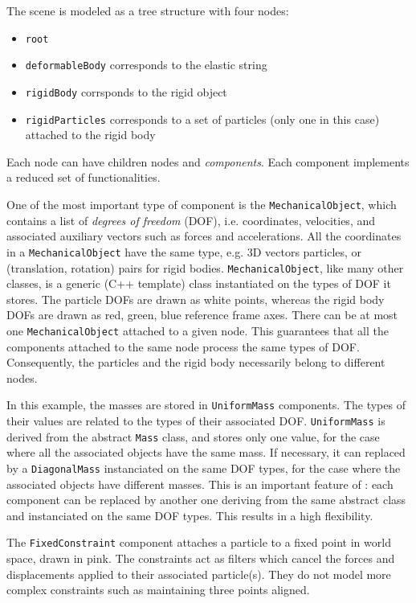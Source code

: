 The scene is modeled as a tree structure with four nodes:
\begin{itemize}
 \item \texttt{root} 
 \item \texttt{deformableBody} corresponds to the elastic string
 \item \texttt{rigidBody} corrsponds to the rigid object
 \item \texttt{rigidParticles} corresponds to a set of particles (only one in this case) attached to the rigid body
\end{itemize}
Each node can have children nodes and \textit{components}. Each component implements a reduced set of functionalities.


One of the most important type of component is the \texttt{MechanicalObject}, which contains a list of \textit{degrees of freedom} (DOF), i.e. coordinates, velocities, and associated auxiliary vectors such as forces and accelerations. 
All the coordinates in a \texttt{MechanicalObject} have the same type, e.g. 3D vectors particles, or (translation, rotation) pairs for rigid bodies. \texttt{MechanicalObject}, like many other \sofa classes, is a generic (C++ template) class instantiated on the types of DOF it stores.
The particle DOFs are drawn as white points, whereas the rigid body DOFs are drawn as red, green, blue reference frame axes.
There can be at most one \texttt{MechanicalObject} attached to a given node. This guarantees that all the components attached to the same node process the same types of DOF. Consequently, the particles and the rigid body necessarily belong to different nodes. 

In this example, the masses are stored in \texttt{UniformMass} components.
The types of their values are related to the types of their associated DOF.
\texttt{UniformMass} is derived from the abstract \texttt{Mass} class, and stores only one value, for the case where all the associated objects have the same mass. If necessary, it can replaced by a \texttt{DiagonalMass} instanciated on the same DOF types, for the case where the associated objects have different masses. This is an important feature of \sofa: each component can be replaced by another one deriving from the same abstract class and instanciated on the same DOF types. This results in a high flexibility.

The \texttt{FixedConstraint} component attaches a particle to a fixed point in world space, drawn in pink. The constraints act as filters which cancel the forces and displacements applied to their associated particle(s). They do not model more complex constraints such as maintaining three points aligned.

